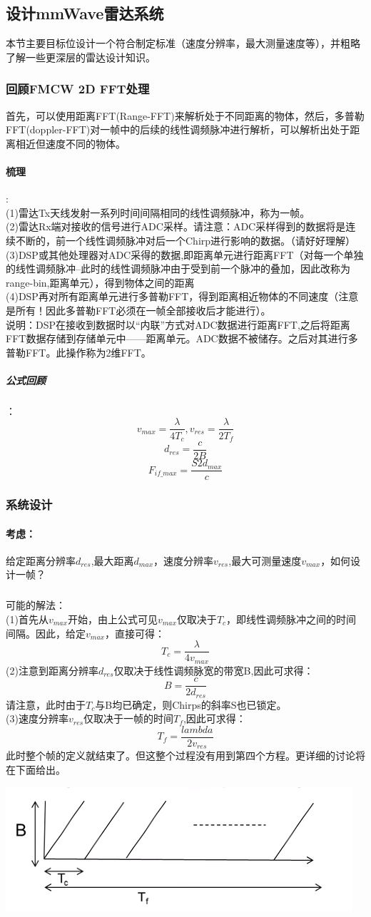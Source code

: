 \documentclass[UTF8]{ctexart}
\begin{document}
\subsection{设计mmWave雷达系统}
本节主要目标位设计一个符合制定标准（速度分辨率，最大测量速度等），并粗略了解一些更深层的雷达设计知识。
\subsubsection{回顾FMCW 2D FFT处理}
首先，可以使用距离FFT(Range-FFT)来解析处于不同距离的物体，然后，多普勒FFT(doppler-FFT)对一帧中的后续的线性调频脉冲进行解析，可以解析出处于距离相近但速度不同的物体。
\paragraph{梳理}:\\
(1)雷达Tx天线发射一系列时间间隔相同的线性调频脉冲，称为一帧。\\
(2)雷达Rx端对接收的信号进行ADC采样。请注意：ADC采样得到的数据将是连续不断的，前一个线性调频脉冲对后一个Chirp进行影响的数据。（请好好理解）\\
(3)DSP或其他处理器对ADC采得的数据,即距离单元进行距离FFT（对每一个单独的线性调频脉冲--此时的线性调频脉冲由于受到前一个脉冲的叠加，因此改称为range-bin,距离单元），得到物体之间的距离\\
(4)DSP再对所有距离单元进行多普勒FFT，得到距离相近物体的不同速度（注意是所有！因此多普勒FFT必须在一帧全部接收后才能进行）。\\
说明：DSP在接收到数据时以“内联”方式对ADC数据进行距离FFT,之后将距离FFT数据存储到存储单元中——距离单元。ADC数据不被储存。之后对其进行多普勒FFT。此操作称为2维FFT。
\subparagraph{公式回顾}：\\
\[v_{max}=\frac{\lambda}{4T_c},v_{res}=\frac{\lambda}{2T_f}\]
\[d_{res}=\frac{c}{2B}\]
\[F_{if\_max}=\frac{S2d_{max}}{c}\]
\subsubsection{系统设计}
\paragraph{考虑：}给定距离分辨率$d_{res}$,最大距离$d_{max}$，速度分辨率$v_{res}$,最大可测量速度$v_{max}$，如何设计一帧？
\subparagraph{}
可能的解法：\\
(1)首先从$v_{max}$开始，由上公式可见$v_{max}$仅取决于$T_c$，即线性调频脉冲之间的时间间隔。因此，给定$v_{max}$，直接可得：
\[T_c=\frac{\lambda}{4v_{max}}\]
(2)注意到距离分辨率$d_{res}$仅取决于线性调频脉宽的带宽B,因此可求得：
\[B=\frac{c}{2d_{res}}\]
请注意，此时由于$T_c$与B均已确定，则Chirps的斜率S也已锁定。\\
(3)速度分辨率$v_{res}$仅取决于一帧的时间$T_f$,因此可求得：
\[T_f=\frac{lambda}{2v_{res}}\]
此时整个帧的定义就结束了。但这整个过程没有用到第四个方程。更详细的讨论将在下面给出。
{\centering \includegraphics[width = .4\textwidth]{pic/defineaframe.png}

}
\end{document}
